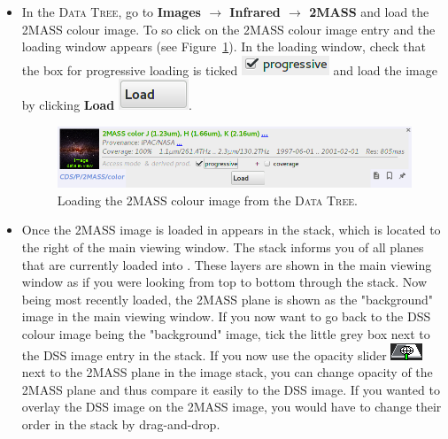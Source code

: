 \documentclass [a4paper, 12pt]{article}
\begin{document}
\begin{itemize}
    \item In the \textsc{Data Tree}, go to \textbf{Images $\rightarrow$
Infrared $\rightarrow$ 2MASS} and load the 2MASS colour image. To so click on
the 2MASS colour image entry and the loading window appears (see
Figure~\ref{fig:aladin_load_2mass}). In the loading window, check that the box
for progressive loading is ticked \includegraphics[width=0.07
\textwidth]{../images/aladin_load_progessive.png} and load the image by
clicking \textbf{Load}  \includegraphics[width=0.07
\textwidth]{../images/aladin_load_load.png}.

\begin{figure}[H]
    \center
    \includegraphics[width=1
    \textwidth]{../images/aladin_load_2mass-rgb-image.png}
    \caption{Loading the 2MASS colour image from the \textsc{Data Tree}. }
    \label{fig:aladin_load_2mass}
\end{figure}

    \item Once the 2MASS image is loaded in appears in the stack, which is
    located to the right of the main viewing window. The stack informs you of
    all planes that are currently loaded into \aladin. These layers are shown
    in the main viewing window as if you were looking from top to bottom
    through the stack. Now being most recently loaded, the 2MASS plane is shown
    as the "background" image in the main viewing window. If you now want to go
    back to the DSS colour image being the "background" image, tick the little
    grey box next to the DSS image entry in the stack. If you now use the
    opacity slider \includegraphics[width=0.035
    \textwidth]{../images/aladin_button_opacity.png} next to the 2MASS plane in
    the image stack, you can change opacity of the 2MASS plane and thus compare
    it easily to the DSS image. If you wanted to overlay the DSS image on the
    2MASS image, you would have to change their order in the stack by drag-and-drop.


\end{itemize}
\end{document}
